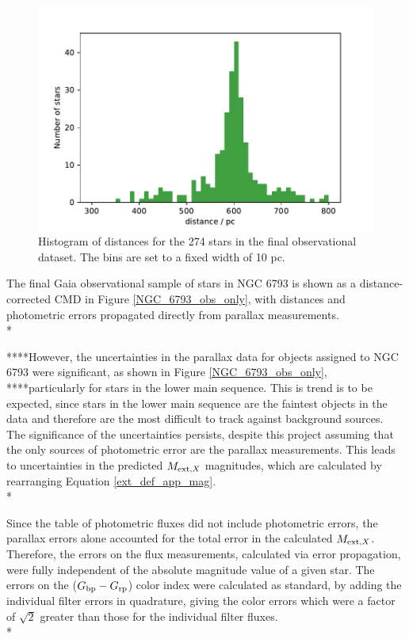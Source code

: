 \documentclass[12pt, a4paper]{report}
\begin{document}
\begin{figure}[h]
\begin{center}
\includegraphics[width=1.0\textwidth]{../NGC_6793_distances_hist.pdf}
\caption{Histogram of distances for the 274 stars in the final observational dataset. The bins are set to a fixed width of 10 pc.}
\label{NGC_6793_dist_hist}
\end{center}
\end{figure}

The final Gaia observational sample of stars in NGC 6793 is shown as a distance-corrected CMD in Figure \ref{NGC_6793_obs_only}, with distances and photometric errors propagated directly from parallax measurements.\\*

****However, the uncertainties in the parallax data for objects assigned to NGC 6793 were significant, as shown in Figure \ref{NGC_6793_obs_only}, ****particularly for stars in the lower main sequence. This is trend is to be expected, since stars in the lower main sequence are the faintest objects in the data and therefore are the most difficult to track against background sources. The significance of the uncertainties persists, despite this project assuming that the only sources of photometric error are the parallax measurements. This leads to uncertainties in the predicted $M_{\textnormal{ext},X}$ magnitudes, which are calculated by rearranging Equation \ref{ext_def_app_mag}.\\*

Since the table of photometric fluxes did not include photometric errors, the parallax errors alone accounted for the total error in the calculated $M_{\textnormal{ext},X}$. Therefore, the errors on the flux measurements, calculated via error propagation, were fully independent of the absolute magnitude value of a given star. The errors on the ($G_{\textnormal{bp}}-G_{\textnormal{rp}}$) color index were calculated as standard, by adding the individual filter errors in quadrature, giving the color errors which were a factor of $\sqrt{2}$ greater than those for the individual filter fluxes.\\*
\end{document}
